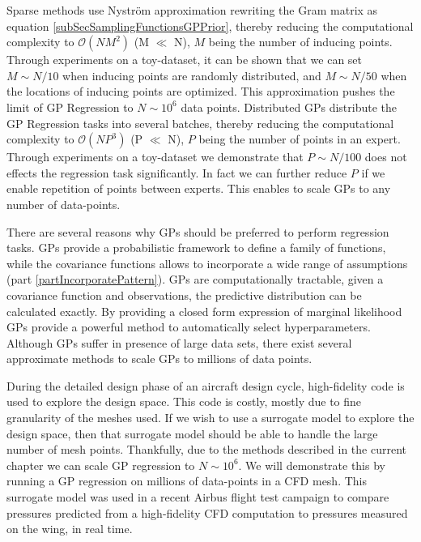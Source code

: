 Sparse methods use Nystr\"{o}m approximation rewriting the Gram matrix as equation \ref{subSecSamplingFunctionsGPPrior}, thereby reducing the computational complexity to $\mathcal{O}(NM^{2})$ (M $\ll$ N), $M$ being the number of inducing points. Through experiments on a toy-dataset, it can be shown that we can set $M \sim N/10$ when inducing points are randomly distributed, and $M \sim N/50$ when the locations of inducing points are optimized. This approximation pushes the limit of GP Regression to $N \sim 10^6$ data points. Distributed GPs distribute the GP Regression tasks into several batches, thereby reducing the computational complexity to $\mathcal{O}(NP^{3})$ (P $\ll$ N), $P$ being the number of points in an expert. Through experiments on a toy-dataset we demonstrate that $P \sim N/100$ does not effects the regression task significantly. In fact we can further reduce $P$ if we enable repetition of points between experts. This enables to scale GPs to any number of data-points.

There are several reasons why GPs should be preferred to perform regression tasks. GPs provide a probabilistic framework to define a family of functions, while the covariance functions allows to incorporate a wide range of assumptions (part \ref{partIncorporatePattern}). GPs are computationally tractable, given a covariance function and observations, the predictive distribution can be calculated exactly. By providing a closed form expression of marginal likelihood GPs provide a powerful method to automatically select hyperparameters. Although GPs suffer in presence of large data sets, there exist several approximate methods to scale GPs to millions of data points. 

During the detailed design phase of an aircraft design cycle, high-fidelity code is used to explore the design space. This code is costly, mostly due to fine granularity of the meshes used. If we wish to use a surrogate model to explore the design space, then that surrogate model should be able to handle the large number of mesh points. Thankfully, due to the methods described in the current chapter we can scale GP regression to $N \sim 10^6$. We will demonstrate this by running a GP regression on millions of data-points in a CFD mesh. This surrogate model was used in a recent Airbus flight test campaign to compare pressures predicted from a high-fidelity CFD computation to pressures measured on the wing, in real time.

